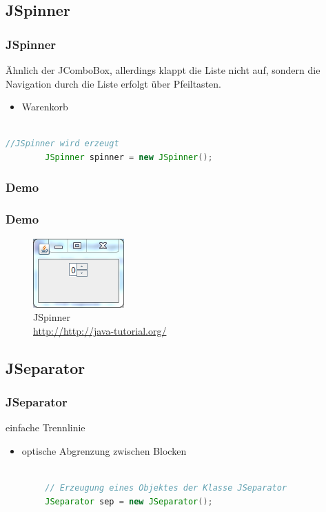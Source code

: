 \documentclass[xcolor=dvipsnames]{beamer}
\begin{document}
\subsection{JSpinner}
\begin{frame}  %
  \frametitle{JSpinner
} %
  \begin{block}{Ähnlich der JComboBox, allerdings klappt die Liste nicht auf, sondern die Navigation durch die Liste erfolgt über Pfeiltasten.}
	  \begin{itemize}
		\item Warenkorb 
	  \end{itemize}
  \end{block}

\begin{lstlisting}[language=java,basicstyle=\scriptsize\ttfamily]

//JSpinner wird erzeugt
		JSpinner spinner = new JSpinner();

\end{lstlisting}

\end{frame}

\subsubsection{Demo}
\begin{frame}
  \frametitle{Demo}
	\begin{figure}
		\includegraphics[scale=1.0]{images/jspinner.PNG}
		\caption{JSpinner \\ \tiny{\textcolor{gray}{\url{http://http://java-tutorial.org/}}}}
		\end{figure}
\end{frame}

\subsection{JSeparator}
\begin{frame}  %
  \frametitle{JSeparator
} %
  \begin{block}{einfache Trennlinie}
	  \begin{itemize}
		\item optische Abgrenzung zwischen Blocken
	  \end{itemize}
  \end{block}

\begin{lstlisting}[language=java,basicstyle=\scriptsize\ttfamily]

        // Erzeugung eines Objektes der Klasse JSeparator
        JSeparator sep = new JSeparator();

\end{lstlisting}

\end{frame}
\end{document}
